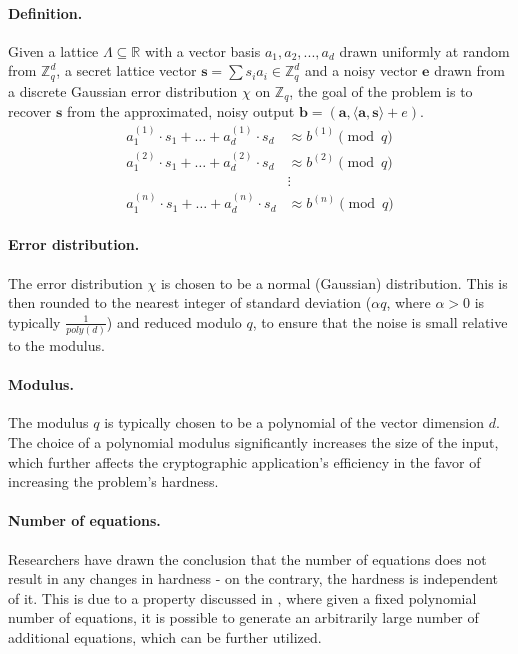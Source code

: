 \documentclass[11pt,
  titlepage=false,
  abstract=on,
]{scrreprt}
\begin{document}
\paragraph{Definition.} Given a lattice $\Lambda \subseteq \mathbb{R}$ with a vector basis $a_1, a_2,..., a_d$ drawn uniformly at random from $\mathbb{Z}^d_q$, a secret lattice vector $\mathbf{s}=\sum s_ia_i \in \mathbb{Z}^d_q$ 
and a noisy vector $\mathbf{e}$ drawn from a discrete Gaussian error distribution $\chi$ on $\mathbb{Z}_q$, the goal of the problem is to recover $\mathbf{s}$ from the approximated, noisy output 
$\mathbf{b} = (\mathbf{a}, \langle \mathbf{a}, \mathbf{s} \rangle + e)$. \cite{regev2010learning}\\

\[
  \begin{aligned}
a_1^{(1)} \cdot s_1 + \dots + a_d^{(1)} \cdot s_d &\approx b^{(1)} \pmod{q} \\
a_1^{(2)} \cdot s_1 + \dots + a_d^{(2)} \cdot s_d &\approx b^{(2)} \pmod{q} \\
&\vdots \\
a_1^{(n)} \cdot s_1 + \dots + a_d^{(n)} \cdot s_d &\approx b^{(n)} \pmod{q}
\label{The Learning with Errors Problem}
\end{aligned}
\]

\paragraph{Error distribution.}
The error distribution $\chi$ is chosen to be a normal (Gaussian) distribution. This is then rounded to the nearest integer of standard deviation ($\alpha q$, where $\alpha > 0$ is typically $\frac{1}{poly(d)}$)
and reduced modulo $q$, to ensure that the noise is small relative to the modulus.

\paragraph{Modulus.} The modulus $q$ is typically chosen to be a polynomial of the vector dimension $d$. The choice of a polynomial modulus significantly increases the size of the input, which further affects
the cryptographic application's efficiency in the favor of increasing the problem's hardness.

\paragraph{Number of equations.} Researchers have drawn the conclusion that the number of equations does not result in any changes in hardness - on the contrary, the hardness is independent of it.
This is due to a property discussed in \cite{regev2010learning}, where given a fixed polynomial number of equations,  it is possible to generate an arbitrarily large number of additional equations, 
which can be further utilized.\\
\end{document}

